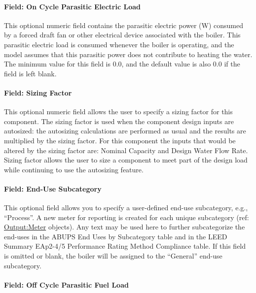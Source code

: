 \paragraph{Field: On Cycle Parasitic Electric Load}\label{field-parasitic-electric-load-000}

This optional numeric field contains the parasitic electric power (W) consumed by a forced draft fan or other electrical device associated with the boiler. This parasitic electric load is consumed whenever the boiler is operating, and the model assumes that this parasitic power does not contribute to heating the water. The minimum value for this field is 0.0, and the default value is also 0.0 if the field is left blank.

\paragraph{Field: Sizing Factor}\label{field-sizing-factor-10}

This optional numeric field allows the user to specify a sizing factor for this component. The sizing factor is used when the component design inputs are autosized: the autosizing calculations are performed as usual and the results are multiplied by the sizing factor. For this component the inputs that would be altered by the sizing factor are: Nominal Capacity and Design Water Flow Rate. Sizing factor allows the user to size a component to meet part of the design load while continuing to use the autosizing feature.

\paragraph{Field: End-Use Subcategory}\label{end-use-subcategory-10}

This optional field allows you to specify a user-defined end-use subcategory, e.g., ``Process''. A new meter for reporting is created for each unique subcategory (ref: \hyperref[outputmeter-and-outputmetermeterfileonly]{Output:Meter} objects). Any text may be used here to further subcategorize the end-uses in the ABUPS End Uses by Subcategory table and in the LEED Summary EAp2-4/5 Performance Rating Method Compliance table. If this field is omitted or blank, the boiler will be assigned to the ``General'' end-use subcategory.

\paragraph{Field: Off Cycle Parasitic Fuel Load}\label{field-boiler-parasitic-fuel-load}

